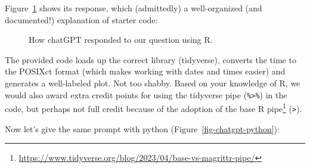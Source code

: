 \documentclass[
  letterpaper,
]{krantz}
\renewcommand{\href}[2]{#2\footnote{\url{#1}}}
\begin{document}
Figure~\ref{fig-chatgpt-r} shows its response, which (admittedly) a
well-organized (and documented!) explanation of starter code:

\begin{figure}


\caption{\label{fig-chatgpt-r}How chatGPT responded to our question
using R.}

\end{figure}%

The provided code loads up the correct library (tidyverse), converts the
time to the POSIXct format (which makes working with dates and times
easier) and generates a well-labeled plot. Not too shabby. Based on your
knowledge of R, we would also award extra credit points for using the
tidyverse pipe (\texttt{\%\textgreater{}\%}) in the code, but perhaps
not full credit because of the adoption of the
\href{https://www.tidyverse.org/blog/2023/04/base-vs-magrittr-pipe/}{base
R pipe} (\texttt{\textbar{}\textgreater{}}).

Now let's give the same prompt with python
(Figure~\ref{fig-chatgpt-python}):
\end{document}
